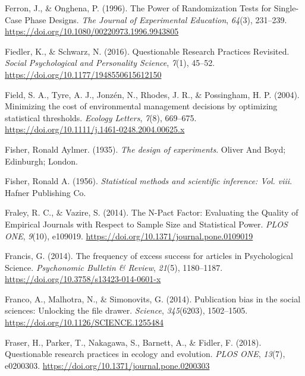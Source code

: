 \documentclass[
  letterpaper,
  DIV=11,
  numbers=noendperiod]{scrreprt}
\newlength{\cslhangindent}
\newlength{\cslentryspacingunit} %
\newenvironment{CSLReferences}[2] %
 {%
  \setlength{\parindent}{0pt}
  \ifodd #1
  \let\oldpar\par
  \def\par{\hangindent=\cslhangindent\oldpar}
  \fi
  \setlength{\parskip}{#2\cslentryspacingunit}
 }%
 {}
\begin{document}
\begin{CSLReferences}{1}{0}
\leavevmode{}%
Ferron, J., \& Onghena, P. (1996). The {Power} of {Randomization Tests}
for {Single-Case Phase Designs}. \emph{The Journal of Experimental
Education}, \emph{64}(3), 231--239.
\url{https://doi.org/10.1080/00220973.1996.9943805}

\leavevmode{}%
Fiedler, K., \& Schwarz, N. (2016). Questionable {Research Practices
Revisited}. \emph{Social Psychological and Personality Science},
\emph{7}(1), 45--52. \url{https://doi.org/10.1177/1948550615612150}

\leavevmode{}%
Field, S. A., Tyre, A. J., Jonzén, N., Rhodes, J. R., \& Possingham, H.
P. (2004). Minimizing the cost of environmental management decisions by
optimizing statistical thresholds. \emph{Ecology Letters}, \emph{7}(8),
669--675. \url{https://doi.org/10.1111/j.1461-0248.2004.00625.x}

\leavevmode{}%
Fisher, Ronald Aylmer. (1935). \emph{The design of experiments}. {Oliver
And Boyd; Edinburgh; London}.

\leavevmode{}%
Fisher, Ronald A. (1956). \emph{Statistical methods and scientific
inference: Vol. viii}. {Hafner Publishing Co.}

\leavevmode{}%
Fraley, R. C., \& Vazire, S. (2014). The {N-Pact Factor}: {Evaluating}
the {Quality} of {Empirical Journals} with {Respect} to {Sample Size}
and {Statistical Power}. \emph{PLOS ONE}, \emph{9}(10), e109019.
\url{https://doi.org/10.1371/journal.pone.0109019}

\leavevmode{}%
Francis, G. (2014). The frequency of excess success for articles in
{Psychological Science}. \emph{Psychonomic Bulletin \& Review},
\emph{21}(5), 1180--1187.
\url{https://doi.org/10.3758/s13423-014-0601-x}

\leavevmode{}%
Franco, A., Malhotra, N., \& Simonovits, G. (2014). Publication bias in
the social sciences: {Unlocking} the file drawer. \emph{Science},
\emph{345}(6203), 1502--1505.
\url{https://doi.org/10.1126/SCIENCE.1255484}

\leavevmode{}%
Fraser, H., Parker, T., Nakagawa, S., Barnett, A., \& Fidler, F. (2018).
Questionable research practices in ecology and evolution. \emph{PLOS
ONE}, \emph{13}(7), e0200303.
\url{https://doi.org/10.1371/journal.pone.0200303}


\end{CSLReferences}
\end{document}
